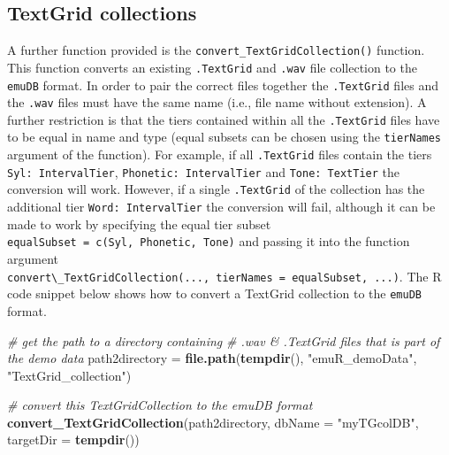 \documentclass[]{book}
\newenvironment{Shaded}{\begin{snugshade}}{\end{snugshade}}
\newcommand{\CommentTok}[1]{\textcolor[rgb]{0.56,0.35,0.01}{\textit{#1}}}
\newcommand{\DataTypeTok}[1]{\textcolor[rgb]{0.13,0.29,0.53}{#1}}
\newcommand{\KeywordTok}[1]{\textcolor[rgb]{0.13,0.29,0.53}{\textbf{#1}}}
\newcommand{\NormalTok}[1]{#1}
\newcommand{\StringTok}[1]{\textcolor[rgb]{0.31,0.60,0.02}{#1}}
\begin{document}
\hypertarget{textgrid-collections}{%
\subsection{TextGrid collections}\label{textgrid-collections}}

A further function provided is the \texttt{convert\_TextGridCollection()} function. This function converts an existing \texttt{.TextGrid} and \texttt{.wav} file collection to the \texttt{emuDB} format. In order to pair the correct files together the \texttt{.TextGrid} files and the \texttt{.wav} files must have the same name (i.e., file name without extension). A further restriction is that the tiers contained within all the \texttt{.TextGrid} files have to be equal in name and type (equal subsets can be chosen using the \texttt{tierNames} argument of the function). For example, if all \texttt{.TextGrid} files contain the tiers \texttt{Syl:\ IntervalTier}, \texttt{Phonetic:\ IntervalTier} and \texttt{Tone:\ TextTier} the conversion will work. However, if a single \texttt{.TextGrid} of the collection has the additional tier \texttt{Word:\ IntervalTier} the conversion will fail, although it can be made to work by specifying the equal tier subset \texttt{equalSubset\ =\ c(\textquotesingle{}Syl\textquotesingle{},\ \textquotesingle{}Phonetic\textquotesingle{},\ \textquotesingle{}Tone\textquotesingle{})} and passing it into the function argument \texttt{convert\textbackslash{}\_TextGridCollection(...,\ tierNames\ =\ equalSubset,\ ...)}. The R code snippet below shows how to convert a TextGrid collection to the \texttt{emuDB} format.

\begin{Shaded}
\begin{Highlighting}[]
\CommentTok{# get the path to a directory containing}
\CommentTok{# .wav & .TextGrid files that is part of the demo data}
\NormalTok{path2directory =}\StringTok{ }\KeywordTok{file.path}\NormalTok{(}\KeywordTok{tempdir}\NormalTok{(),}
                           \StringTok{"emuR_demoData"}\NormalTok{,}
                           \StringTok{"TextGrid_collection"}\NormalTok{)}

\CommentTok{# convert this TextGridCollection to the emuDB format}
\KeywordTok{convert_TextGridCollection}\NormalTok{(path2directory, }\DataTypeTok{dbName =} \StringTok{"myTGcolDB"}\NormalTok{,}
                           \DataTypeTok{targetDir =} \KeywordTok{tempdir}\NormalTok{())}
\end{Highlighting}
\end{Shaded}
\end{document}
